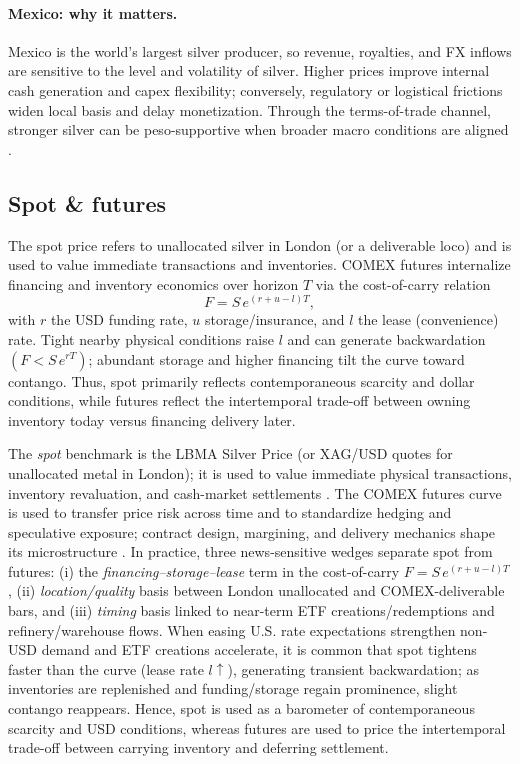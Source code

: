 \documentclass[10pt,a4paper]{article} %
\begin{document}
\paragraph{Mexico: why it matters.}
Mexico is the world’s largest silver producer, so revenue, royalties, and FX inflows are sensitive to the level and volatility of silver. Higher prices improve internal cash generation and capex flexibility; conversely, regulatory or logistical frictions widen local basis and delay monetization. Through the terms-of-trade channel, stronger silver can be peso-supportive when broader macro conditions are aligned \citep{reuters_mx_top_silver}.

\subsection{Spot \& futures}
The spot price refers to unallocated silver in London (or a deliverable loco) and is used to value immediate transactions and inventories. COMEX futures internalize financing and inventory economics over horizon \(T\) via the cost-of-carry relation
\[
F=S\,e^{(r+u-l)T},
\]
with \(r\) the USD funding rate, \(u\) storage/insurance, and \(l\) the lease (convenience) rate. Tight nearby physical conditions raise \(l\) and can generate backwardation \((F<S\,e^{rT})\); abundant storage and higher financing tilt the curve toward contango. Thus, spot primarily reflects contemporaneous scarcity and dollar conditions, while futures reflect the intertemporal trade-off between owning inventory today versus financing delivery later.

The \emph{spot} benchmark is the LBMA Silver Price (or XAG/USD quotes for unallocated metal in London); it is used to value immediate physical transactions, inventory revaluation, and cash-market settlements \citep{lbma_prices}. The COMEX futures curve is used to transfer price risk across time and to standardize hedging and speculative exposure; contract design, margining, and delivery mechanics shape its microstructure \citep{cme_silver_overview}. In practice, three news-sensitive wedges separate spot from futures: (i) the \emph{financing–storage–lease} term in the cost-of-carry \(F=S\,e^{(r+u-l)T}\), (ii) \emph{location/quality} basis between London unallocated and COMEX-deliverable bars, and (iii) \emph{timing} basis linked to near-term ETF creations/redemptions and refinery/warehouse flows. When easing U.S. rate expectations strengthen non-USD demand and ETF creations accelerate, it is common that spot tightens faster than the curve (lease rate \(l\uparrow\)), generating transient backwardation; as inventories are replenished and funding/storage regain prominence, slight contango reappears. Hence, spot is used as a barometer of contemporaneous scarcity and USD conditions, whereas futures are used to price the intertemporal trade-off between carrying inventory and deferring settlement.
\end{document}
